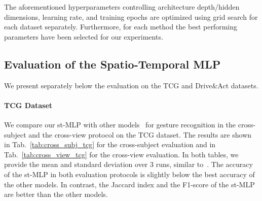 \documentclass[letterpaper, 10 pt, conference]{ieeeconf}
\begin{document}
The aforementioned hyperparameters controlling architecture depth/hidden dimensions, learning rate, and training epochs are optimized using grid search for each dataset separately. Furthermore, for each method the best performing parameters have been selected for our experiments.

\subsection{Evaluation of the Spatio-Temporal MLP}
\label{subsec:eval_mlp}

We present separately below the evaluation on the TCG and Drive\&Act datasets.

\paragraph{TCG Dataset}
\label{para:tcg_dataset_eval}
We compare our st-MLP with other models~\cite{wiederer2020traffic} for gesture recognition in the cross-subject and the cross-view protocol on the TCG dataset. The results are shown in Tab.~\ref{tab:cross_subj_tcg} for the cross-subject evaluation and in Tab.~\ref{tab:cross_view_tcg} for the cross-view evaluation. In both tables, we provide the mean and standard deviation over 3 runs, similar to~\cite{wiederer2020traffic}. The accuracy of the st-MLP in both evaluation protocols is slightly below the best accuracy of the other models. In contrast, the Jaccard index and the F1-score of the st-MLP are better than the other models.
\end{document}
